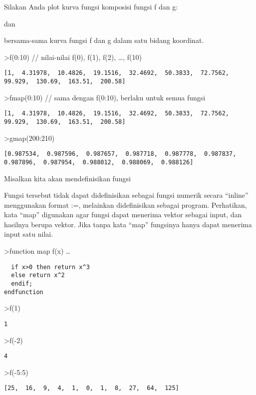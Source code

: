 \documentclass[
]{book}
\begin{document}
Silakan Anda plot kurva fungsi komposisi fungsi f dan g:

dan

bersama-sama kurva fungsi f dan g dalam satu bidang koordinat.

\textgreater f(0:10) // nilai-nilai f(0), f(1), f(2), \ldots, f(10)

\begin{verbatim}
[1,  4.31978,  10.4826,  19.1516,  32.4692,  50.3833,  72.7562,
99.929,  130.69,  163.51,  200.58]
\end{verbatim}

\textgreater fmap(0:10) // sama dengan f(0:10), berlaku untuk semua fungsi

\begin{verbatim}
[1,  4.31978,  10.4826,  19.1516,  32.4692,  50.3833,  72.7562,
99.929,  130.69,  163.51,  200.58]
\end{verbatim}

\textgreater gmap(200:210)

\begin{verbatim}
[0.987534,  0.987596,  0.987657,  0.987718,  0.987778,  0.987837,
0.987896,  0.987954,  0.988012,  0.988069,  0.988126]
\end{verbatim}

Misalkan kita akan mendefinisikan fungsi

Fungsi tersebut tidak dapat didefinisikan sebagai fungsi numerik secara ``inline'' menggunakan format :=, melainkan didefinisikan sebagai program. Perhatikan, kata ``map'' digunakan agar fungsi dapat menerima vektor sebagai input, dan hasilnya berupa vektor. Jika tanpa kata ``map'' fungsinya hanya dapat menerima input satu nilai.

\textgreater function map f(x) \ldots{}

\begin{verbatim}
  if x>0 then return x^3
  else return x^2
  endif;
endfunction
\end{verbatim}

\textgreater f(1)

\begin{verbatim}
1
\end{verbatim}

\textgreater f(-2)

\begin{verbatim}
4
\end{verbatim}

\textgreater f(-5:5)

\begin{verbatim}
[25,  16,  9,  4,  1,  0,  1,  8,  27,  64,  125]
\end{verbatim}
\end{document}
